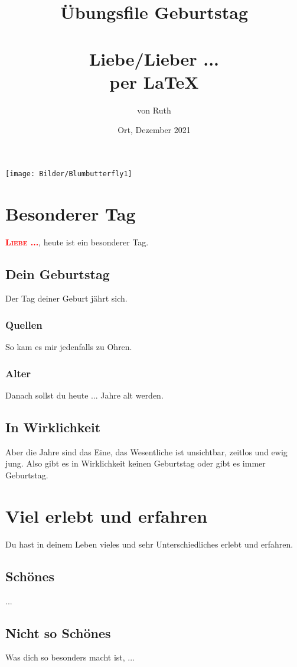 \documentclass[12pt,ngerman,parskip=full]{scrreprt}
\author{von Ruth}
\title{Übungsfile Geburtstag\\
\person{Für einen sehr besonderen Menschen:} \\
Liebe/Lieber ...\\
per \LaTeX}
\date{Ort, Dezember 2021}
\newcommand{\person}[1]{\textsc{\textcolor{red}{#1}}}
\begin{document}
\maketitle

\tableofcontents

\listoffigures

\begin{center}
\texttt{[image: Bilder/Blumbutterfly1]}\label{fig:Blumbutterfly1}
\end{center}

\chapter{Besonderer Tag}
\person{\textbf{Liebe ...}}, heute ist ein besonderer Tag. 
\section{Dein Geburtstag}
Der Tag deiner Geburt jährt sich. 
\subsection{Quellen}
So kam es mir jedenfalls zu Ohren. 
\subsection{Alter}
Danach sollst du heute ... Jahre alt werden. 
\section{In Wirklichkeit}
Aber die Jahre sind das Eine, das Wesentliche ist unsichtbar, zeitlos und ewig jung. Also gibt es in Wirklichkeit keinen Geburtstag oder gibt es immer Geburtstag. 

\chapter{Viel erlebt und erfahren}
Du hast in deinem Leben vieles und sehr Unterschiedliches erlebt und erfahren. \\
\section{Schönes}
...
\section{Nicht so Schönes}
Was dich so besonders macht ist, ... 
\end{document}

